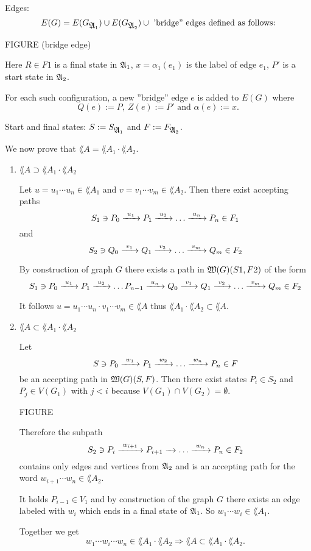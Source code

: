 Edges:
\[ E(G) = E(G_{\mbox{$\mathfrak{A}$}_1}) \cup E(G_{\mbox{$\mathfrak{A}$}_2}) \cup \mbox{ 'bridge'' edges
defined as follows:}
\]

FIGURE (bridge edge)

Here $R \in F1$ is a final state in $\mbox{$\mathfrak{A}$}_1$, $x = \alpha_1(e_1)$ is the label
of edge $e_1$, $P'$ is a start state in $\mbox{$\mathfrak{A}$}_2$.

For each such configuration, a new ''bridge''	edge $e$ is added to $E(G)$ where
\[ Q(e) := P,\ Z(e) := P' \mbox{ and } \alpha(e) := x.\]

Start and final states: $S := S_{\mbox{$\mathfrak{A}$}_1}$ and $F := F_{\mbox{$\mathfrak{A}$}_2}$.

We now prove that $\lang{A} = \lang{A}_1 \cdot \lang{A}_2$.

\begin{enumerate}
  \item $\lang{A} \supset \lang{A}_1 \cdot \lang{A}_2$
  
  Let $u = u_1 \cdots u_n \in \lang{A}_1$ and $v = v_1 \cdots v_m \in
  \lang{A}_2$. Then there exist accepting paths
  \[ S_1 \ni P_0 \xrightarrow{\ {u_1}\ } P_1 \xrightarrow{\ {u_2}\ } \ldots \xrightarrow{\ {u_n}\ } P_n \in F_1 \]
  and 
  \[ S_2 \ni Q_0 \xrightarrow{\ {v_1}\ } Q_1 \xrightarrow{\ {v_2}\ } \ldots \xrightarrow{\ {v_m}\ } Q_m \in F_2 \]
  
  By construction of graph $G$ there exists a path in $\mbox{$\mathfrak{W}(G)$}(S1, F2)$ of
  the form
  \[ S_1 \ni P_0 \xrightarrow{\ {u_1}\ } P_1 \xrightarrow{\ {u_2}\ } \ldots P_{n-1} \xrightarrow{\ {u_n}\ } Q_0
  \xrightarrow{\ {v_1}\ } Q_1 \xrightarrow{\ {v_2}\ } \ldots \xrightarrow{\ {v_m}\ } Q_m \in F_2 \]
  
  It follows $u = u_1 \cdots u_n \cdot v_1 \cdots v_m \in \lang{A}$ thus
  $\lang{A}_1 \cdot \lang{A}_2 \subset \lang{A}$.
  
  \item $\lang{A} \subset \lang{A}_1 \cdot \lang{A}_2$
  
  Let \[ S \ni P_0 \xrightarrow{\ {w_1}\ } P_1 \xrightarrow{\ {w_2}\ } \ldots \xrightarrow{\ {w_n}\ } P_n \in F \] be
  an accepting path in $\mbox{$\mathfrak{W}(G)$}(S, F)$. Then there exist states $P_i \in
  S_2$ and $P_j \in V(G_1)$ with $j < i$ because $V(G_1) \cap V(G_2) =
  \emptyset$.
  
  FIGURE
  
  Therefore the subpath \[ S_2 \ni P_i \xrightarrow{\ {w_{i+1}}\ } P_{i+1} \xrightarrow{\ {}\ } \ldots
  \xrightarrow{\ {w_n}\ } P_n \in F_2 \] contains only edges and vertices from $\mbox{$\mathfrak{A}$}_2$ and
  is an accepting path for the word $w_{i+1} \cdots w_n \in \lang{A}_2$.
  
  It holds $P_{i-1} \in V_1$ and by construction of the graph $G$ there exists
  an edge labeled with $w_i$ which ends in a final state of $\mbox{$\mathfrak{A}$}_1$. So $w_1
  \cdots w_i \in \lang{A}_1$.
  
  Together we get \[ w_1 \cdots w_i \cdots w_n \in \lang{A}_1 \cdot
  \lang{A}_2 \Rightarrow \lang{A} \subset \lang{A}_1 \cdot \lang{A}_2.\]
\end{enumerate}

